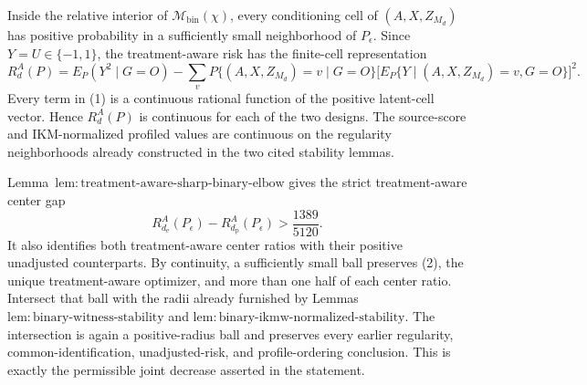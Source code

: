 Inside the relative interior of \(\mathcal M_{\mathrm{bin}}(\chi)\), every conditioning cell of \((A,X,Z_{M_d})\) has positive probability in a sufficiently small neighborhood of \(P_\epsilon\). Since \(Y=U\in\{-1,1\}\), the treatment-aware risk has the finite-cell representation
\[
 R_d^A(P)=E_P(Y^2\mid G=O)
 -\sum_v P\{(A,X,Z_{M_d})=v\mid G=O\}
 \bigl[E_P\{Y\mid (A,X,Z_{M_d})=v,G=O\}\bigr]^2. \tag{1}
\]
Every term in (1) is a continuous rational function of the positive latent-cell vector. Hence \(R_d^A(P)\) is continuous for each of the two designs. The source-score and IKM-normalized profiled values are continuous on the regularity neighborhoods already constructed in the two cited stability lemmas.

Lemma~\(\mathrm{lem{:}treatment\text{-}aware\text{-}sharp\text{-}binary\text{-}elbow}\) gives the strict treatment-aware center gap
\[
 R_{d_{\mathrm e}}^A(P_\epsilon)-R_{d_{\mathrm p}}^A(P_\epsilon)
 >\frac{1389}{5120}. \tag{2}
\]
It also identifies both treatment-aware center ratios with their positive unadjusted counterparts. By continuity, a sufficiently small ball preserves (2), the unique treatment-aware optimizer, and more than one half of each center ratio. Intersect that ball with the radii already furnished by Lemmas~\(\mathrm{lem{:}binary\text{-}witness\text{-}stability}\) and \(\mathrm{lem{:}binary\text{-}ikmw\text{-}normalized\text{-}stability}\). The intersection is again a positive-radius ball and preserves every earlier regularity, common-identification, unadjusted-risk, and profile-ordering conclusion. This is exactly the permissible joint decrease asserted in the statement.